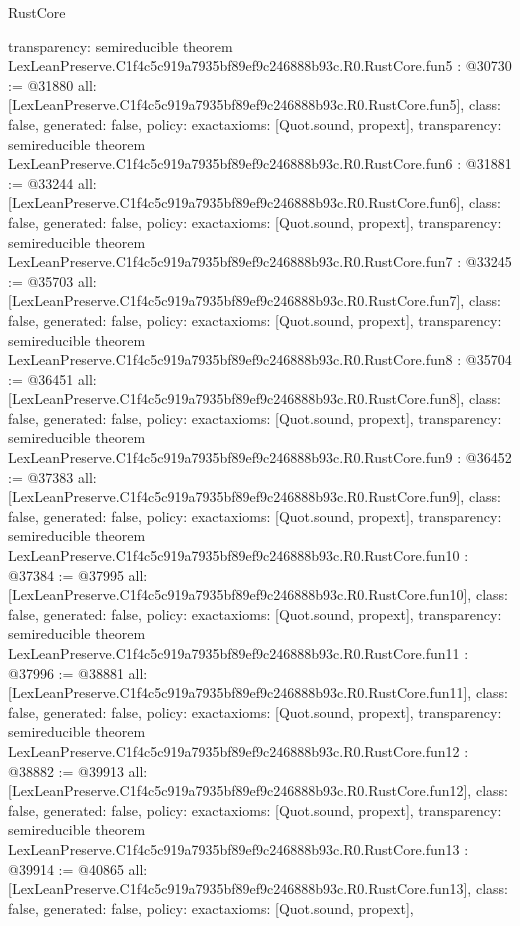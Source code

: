 \begin{lexlean}{RustCore}
\begin{coremodule}
{  transparency: semireducible
}
theorem LexLeanPreserve.C1f4c5c919a7935bf89ef9c246888b93c.R0.RustCore.fun5 : @30730 := @31880 {
  all: [LexLeanPreserve.C1f4c5c919a7935bf89ef9c246888b93c.R0.RustCore.fun5],
  class: false,
  generated: false,
  policy: exact{axioms: [Quot.sound, propext]},
  transparency: semireducible
}
theorem LexLeanPreserve.C1f4c5c919a7935bf89ef9c246888b93c.R0.RustCore.fun6 : @31881 := @33244 {
  all: [LexLeanPreserve.C1f4c5c919a7935bf89ef9c246888b93c.R0.RustCore.fun6],
  class: false,
  generated: false,
  policy: exact{axioms: [Quot.sound, propext]},
  transparency: semireducible
}
theorem LexLeanPreserve.C1f4c5c919a7935bf89ef9c246888b93c.R0.RustCore.fun7 : @33245 := @35703 {
  all: [LexLeanPreserve.C1f4c5c919a7935bf89ef9c246888b93c.R0.RustCore.fun7],
  class: false,
  generated: false,
  policy: exact{axioms: [Quot.sound, propext]},
  transparency: semireducible
}
theorem LexLeanPreserve.C1f4c5c919a7935bf89ef9c246888b93c.R0.RustCore.fun8 : @35704 := @36451 {
  all: [LexLeanPreserve.C1f4c5c919a7935bf89ef9c246888b93c.R0.RustCore.fun8],
  class: false,
  generated: false,
  policy: exact{axioms: [Quot.sound, propext]},
  transparency: semireducible
}
theorem LexLeanPreserve.C1f4c5c919a7935bf89ef9c246888b93c.R0.RustCore.fun9 : @36452 := @37383 {
  all: [LexLeanPreserve.C1f4c5c919a7935bf89ef9c246888b93c.R0.RustCore.fun9],
  class: false,
  generated: false,
  policy: exact{axioms: [Quot.sound, propext]},
  transparency: semireducible
}
theorem LexLeanPreserve.C1f4c5c919a7935bf89ef9c246888b93c.R0.RustCore.fun10 : @37384 := @37995 {
  all: [LexLeanPreserve.C1f4c5c919a7935bf89ef9c246888b93c.R0.RustCore.fun10],
  class: false,
  generated: false,
  policy: exact{axioms: [Quot.sound, propext]},
  transparency: semireducible
}
theorem LexLeanPreserve.C1f4c5c919a7935bf89ef9c246888b93c.R0.RustCore.fun11 : @37996 := @38881 {
  all: [LexLeanPreserve.C1f4c5c919a7935bf89ef9c246888b93c.R0.RustCore.fun11],
  class: false,
  generated: false,
  policy: exact{axioms: [Quot.sound, propext]},
  transparency: semireducible
}
theorem LexLeanPreserve.C1f4c5c919a7935bf89ef9c246888b93c.R0.RustCore.fun12 : @38882 := @39913 {
  all: [LexLeanPreserve.C1f4c5c919a7935bf89ef9c246888b93c.R0.RustCore.fun12],
  class: false,
  generated: false,
  policy: exact{axioms: [Quot.sound, propext]},
  transparency: semireducible
}
theorem LexLeanPreserve.C1f4c5c919a7935bf89ef9c246888b93c.R0.RustCore.fun13 : @39914 := @40865 {
  all: [LexLeanPreserve.C1f4c5c919a7935bf89ef9c246888b93c.R0.RustCore.fun13],
  class: false,
  generated: false,
  policy: exact{axioms: [Quot.sound, propext]},
}
\end{coremodule}
\end{lexlean}
